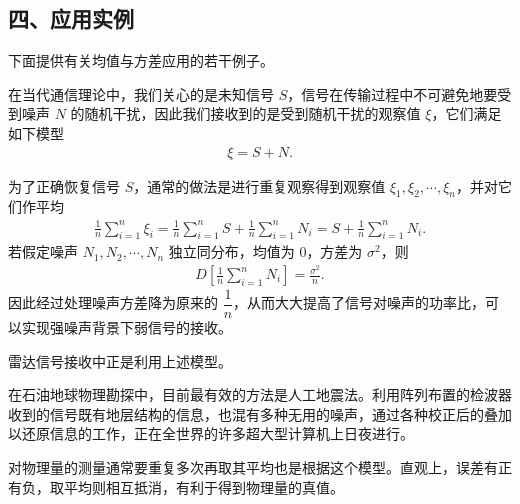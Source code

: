\documentclass[../../main.tex]{subfiles}
\begin{document}
\subsection*{四、应用实例}

下面提供有关均值与方差应用的若干例子。

\begin{example}[信号--噪声模型]\label{example:ch04-信号噪声}
在当代通信理论中，我们关心的是未知信号 $S$，信号在传输过程中不可避免地要受到噪声 $N$ 的随机干扰，因此我们接收到的是受到随机干扰的观察值 $\xi$，它们满足如下模型
\begin{align}
\xi=S+N.\label{align:ch04-信号噪声模型}
\end{align}

为了正确恢复信号 $S$，通常的做法是进行重复观察得到观察值 $\xi_1,\xi_2,\cdots,\xi_n$，并对它们作平均
\begin{align}
\frac{1}{n}\sum_{i=1}^n\xi_i=\frac{1}{n}\sum_{i=1}^n S+\frac{1}{n}\sum_{i=1}^n N_i
=S+\frac{1}{n}\sum_{i=1}^n N_i.\label{align:ch04-平均观察}
\end{align}
若假定噪声 $N_1,N_2,\cdots,N_n$ 独立同分布，均值为 $0$，方差为 $\sigma^2$，则
\begin{align}
D\left[\frac{1}{n}\sum_{i=1}^n N_i\right]=\frac{\sigma^2}{n}.\label{align:ch04-噪声方差降低}
\end{align}
因此经过处理噪声方差降为原来的 $\dfrac{1}{n}$，从而大大提高了信号对噪声的功率比，可以实现强噪声背景下弱信号的接收。

雷达信号接收中正是利用上述模型。

在石油地球物理勘探中，目前最有效的方法是人工地震法。利用阵列布置的检波器收到的信号既有地层结构的信息，也混有多种无用的噪声，通过各种校正后的叠加以还原信息的工作，正在全世界的许多超大型计算机上日夜进行。

对物理量的测量通常要重复多次再取其平均也是根据这个模型。直观上，误差有正有负，取平均则相互抵消，有利于得到物理量的真值。
\end{example}
\end{document}
